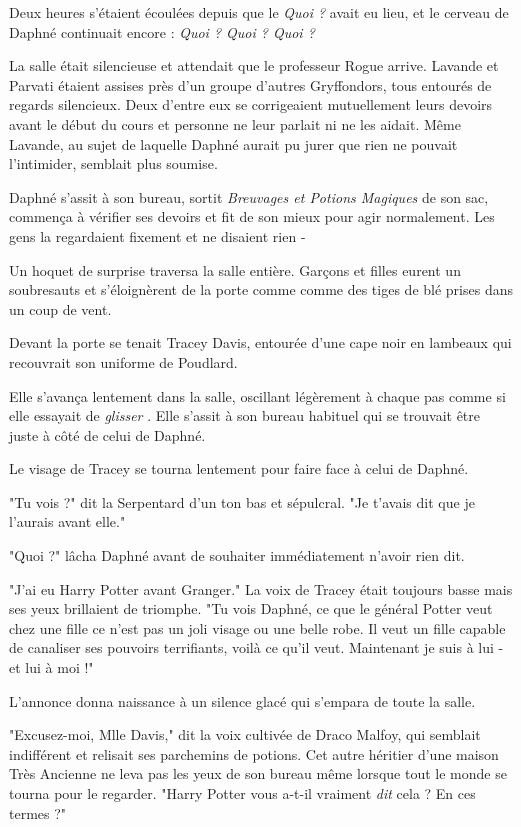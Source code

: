 Deux heures s'étaient écoulées depuis que le \emph{Quoi ? } avait eu lieu, et le cerveau de Daphné continuait encore : \emph{Quoi ? Quoi ? Quoi ?} 

La salle était silencieuse et attendait que le professeur Rogue arrive. Lavande et Parvati étaient assises près d'un groupe d'autres Gryffondors, tous entourés de regards silencieux. Deux d'entre eux se corrigeaient mutuellement leurs devoirs avant le début du cours et personne ne leur parlait ni ne les aidait. Même Lavande, au sujet de laquelle Daphné aurait pu jurer que rien ne pouvait l'intimider, semblait plus soumise.

Daphné s'assit à son bureau, sortit \emph{Breuvages et Potions Magiques}  de son sac, commença à vérifier ses devoirs et fit de son mieux pour agir normalement. Les gens la regardaient fixement et ne disaient rien -

Un hoquet de surprise traversa la salle entière. Garçons et filles eurent un soubresauts et s'éloignèrent de la porte comme comme des tiges de blé prises dans un coup de vent.

Devant la porte se tenait Tracey Davis, entourée d'une cape noir en lambeaux qui recouvrait son uniforme de Poudlard.

Elle s'avança lentement dans la salle, oscillant légèrement à chaque pas comme si elle essayait de \emph{glisser} . Elle s'assit à son bureau habituel qui se trouvait être juste à côté de celui de Daphné.

Le visage de Tracey se tourna lentement pour faire face à celui de Daphné.

"Tu vois ?" dit la Serpentard d'un ton bas et sépulcral. "Je t'avais dit que je l'aurais avant elle."

"Quoi ?" lâcha Daphné avant de souhaiter immédiatement n'avoir rien dit.

"J'ai eu Harry Potter avant Granger." La voix de Tracey était toujours basse mais ses yeux brillaient de triomphe. "Tu vois Daphné, ce que le général Potter veut chez une fille ce n'est pas un joli visage ou une belle robe. Il veut un fille capable de canaliser ses pouvoirs terrifiants, voilà ce qu'il veut. Maintenant je suis à lui - et lui à moi !"

L'annonce donna naissance à un silence glacé qui s'empara de toute la salle.

"Excusez-moi, Mlle Davis," dit la voix cultivée de Draco Malfoy, qui semblait indifférent et relisait ses parchemins de potions. Cet autre héritier d'une maison Très Ancienne ne leva pas les yeux de son bureau même lorsque tout le monde se tourna pour le regarder. "Harry Potter vous a-t-il vraiment \emph{dit}  cela ? En ces termes ?"

